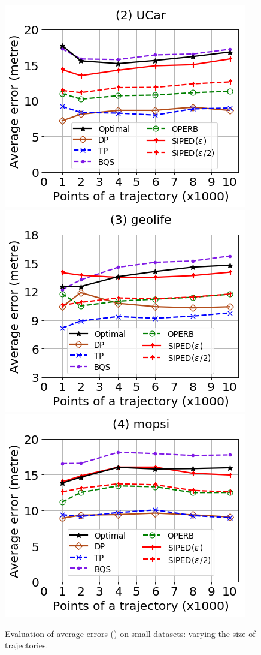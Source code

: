 \begin{figure}[tb!]
	\centering
	\includegraphics[scale=0.320]{Figures/Exp-PED-error-size-service.png} 	\hspace{3ex}
	\includegraphics[scale=0.320]{Figures/Exp-PED-error-size-geolife.png}	\hspace{3ex}
	\includegraphics[scale=0.320]{Figures/Exp-PED-error-size-mopsi.png}		
	\vspace{-2ex}
	\caption{\small Evaluation of average errors (\ped) on small datasets: varying the size of
		trajectories.}
	\label{fig:ae-ped-size}
	\vspace{-2ex}
\end{figure}

